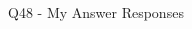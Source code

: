 \begin{frame}{Q48 - My Answer Responses}
\begin{multicols}{2}
    \begin{minipage}{\linewidth}
    \RaggedRight\textbf{\tiny {}} \\ 
    \vspace{4.00pt}
    \end{minipage}
    \vspace{10pt}

    \end{multicols}
\end{frame}
